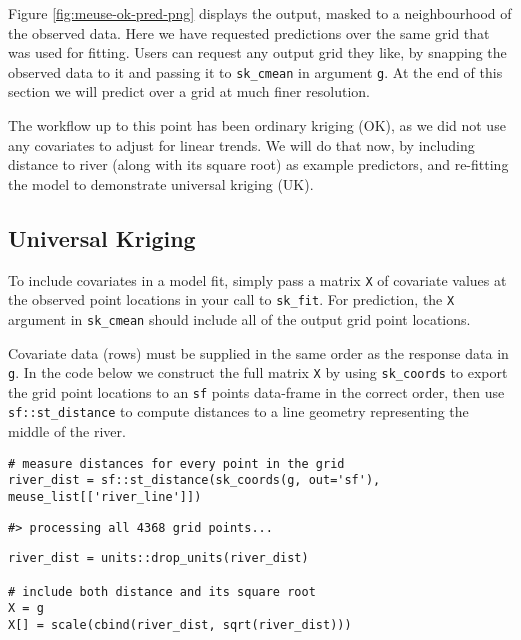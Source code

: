 Figure \ref{fig:meuse-ok-pred-png} displays the output, masked to a neighbourhood of the observed data. Here we have requested predictions over the same grid that was used for fitting. Users can request any output grid they like, by snapping the observed data to it and passing it to \texttt{sk\_cmean} in argument \texttt{g}. At the end of this section we will predict over a grid at much finer resolution.

The workflow up to this point has been ordinary kriging (OK), as we did not use any covariates to adjust for linear trends. We will do that now, by including distance to river (along with its square root) as example predictors, and re-fitting the model to demonstrate universal kriging (UK).

\hypertarget{universal-kriging}{%
\subsection{Universal Kriging}\label{universal-kriging}}

To include covariates in a model fit, simply pass a matrix \texttt{X} of covariate values at the observed point locations in your call to \texttt{sk\_fit}. For prediction, the \texttt{X} argument in \texttt{sk\_cmean} should include all of the output grid point locations.

Covariate data (rows) must be supplied in the same order as the response data in \texttt{g}. In the code below we construct the full matrix \texttt{X} by using \texttt{sk\_coords} to export the grid point locations to an \texttt{sf} points data-frame in the correct order, then use \texttt{sf::st\_distance} to compute distances to a line geometry representing the middle of the river.

\begin{verbatim}
# measure distances for every point in the grid
river_dist = sf::st_distance(sk_coords(g, out='sf'), meuse_list[['river_line']])
\end{verbatim}

\begin{verbatim}
#> processing all 4368 grid points...
\end{verbatim}

\begin{verbatim}
river_dist = units::drop_units(river_dist)

# include both distance and its square root
X = g
X[] = scale(cbind(river_dist, sqrt(river_dist)))
\end{verbatim}

